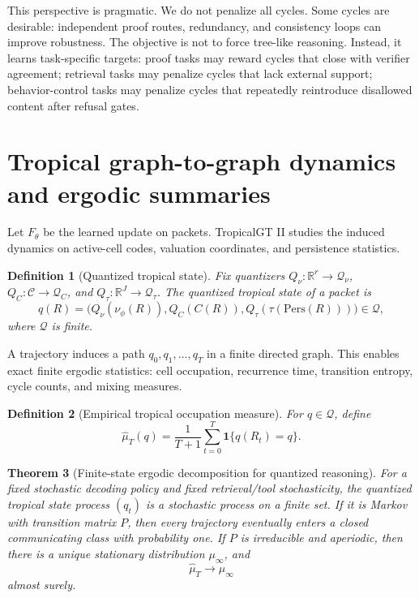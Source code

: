 \documentclass[11pt]{article}
\newtheorem{definition}{Definition}[section]
\newtheorem{theorem}[definition]{Theorem}
\newcommand{\R}{\mathbb{R}}
\newcommand{\calC}{\mathcal{C}}
\newcommand{\calQ}{\mathcal{Q}}
\begin{document}
This perspective is pragmatic.  We do not penalize all cycles.  Some cycles are desirable: independent proof routes, redundancy, and consistency loops can improve robustness.  The objective is not to force tree-like reasoning.  Instead, it learns task-specific targets: proof tasks may reward cycles that close with verifier agreement; retrieval tasks may penalize cycles that lack external support; behavior-control tasks may penalize cycles that repeatedly reintroduce disallowed content after refusal gates.

\section{Tropical graph-to-graph dynamics and ergodic summaries}\label{sec:ergodic}

Let \(F_\theta\) be the learned update on packets.  TropicalGT II studies the induced dynamics on active-cell codes, valuation coordinates, and persistence statistics.

\begin{definition}[Quantized tropical state]
Fix quantizers \(Q_\nu:\R^r\to\calQ_\nu\), \(Q_C:\calC\to\calQ_C\), and \(Q_\tau:\R^J\to\calQ_\tau\).  The quantized tropical state of a packet is
\begin{equation}
q(R)=\big(Q_\nu(\nu_\phi(R)),Q_C(C(R)),Q_\tau(\tau(\mathrm{Pers}(R)))\big)\in\calQ,
\end{equation}
where \(\calQ\) is finite.
\end{definition}

A trajectory induces a path \(q_0,q_1,\ldots,q_T\) in a finite directed graph.  This enables exact finite ergodic statistics: cell occupation, recurrence time, transition entropy, cycle counts, and mixing measures.

\begin{definition}[Empirical tropical occupation measure]
For \(q\in\calQ\), define
\begin{equation}
\hat\mu_T(q)=\frac{1}{T+1}\sum_{t=0}^T\mathbf 1\{q(R_t)=q\}.
\end{equation}
\end{definition}

\begin{theorem}[Finite-state ergodic decomposition for quantized reasoning]
For a fixed stochastic decoding policy and fixed retrieval/tool stochasticity, the quantized tropical state process \((q_t)\) is a stochastic process on a finite set.  If it is Markov with transition matrix \(P\), then every trajectory eventually enters a closed communicating class with probability one.  If \(P\) is irreducible and aperiodic, then there is a unique stationary distribution \(\mu_\infty\), and
\begin{equation}
\hat\mu_T\to\mu_\infty
\end{equation}
almost surely.
\end{theorem}
\end{document}
